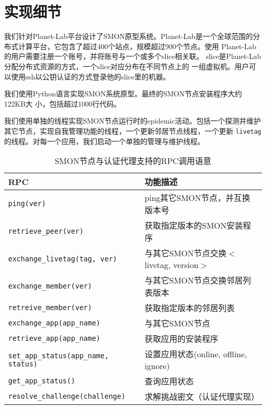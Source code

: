 \section{实现细节}
\label{sec:smon_impl}

我们针对Planet-Lab平台设计了SMON原型系统。Planet-Lab是一个全球范围的分
布式计算平台，它包含了超过400个站点，规模超过900个节点。使用
Planet-Lab的用户需要注册一个账号，并将账号与一个或多个slice相关联。
slice是Planet-Lab分配分布式资源的方式，一个slice对应分布在不同节点上的
一组虚拟机。用户可以使用ssh以公钥认证的方式登录他的slice里的机器。

我们使用Python语言实现SMON系统原型。最终的SMON节点安装程序大约122KB大
小，包括超过1000行代码。

我们使用单独的线程实现SMON节点运行时的epidemic活动。包括一个探测并维护
其它节点，实现自我管理功能的线程，一个更新邻居节点线程，一个更新
\texttt{livetag}的线程。对每一个应用，我们启动一个单独的管理与维护线程。

\begin{table*}
\small
\centering
\caption{SMON节点与认证代理支持的RPC调用语意}
\label{fig:smon_rpc}
\begin{tabular}{lp{7cm}}

\toprule[1.5pt]
\textbf{RPC} & \textbf{功能描述} \\

\midrule[1pt]
\texttt{ping(ver)} & ping其它SMON节点，并互换版本号\\

\texttt{retrieve\_peer(ver)} & 获取指定版本的SMON安装程序\\

\texttt{exchange\_livetag(tag, ver)} & 与其它SMON节点交换$<$livetag,
version$>$\\

\texttt{exchange\_member(ver)} & 与其它SMON节点交换邻居列表版本\\

\texttt{retreive\_member(ver)} & 获取指定版本的邻居列表\\

\texttt{exchange\_app(app\_name)} & 与其它SMON节点\\

\texttt{retrieve\_app(app\_name)} & 获取应用的安装程序\\

\texttt{set\_app\_status(app\_name, status)} & 设置应用状态(online,
offline, ignore)\\

\texttt{get\_app\_status()} & 查询应用状态\\

\texttt{resolve\_challenge(challenge)} & 求解挑战密文（认证代理实现）\\

\bottomrule[1.5pt]
\end{tabular}
\end{table*}

